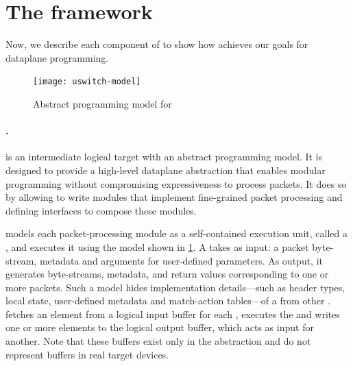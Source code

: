 \documentclass[letterpaper,twocolumn,10pt]{article}
\begin{document}
\section{The \ulang framework}
\label{sec:microp4}
Now, we describe each component of \ulang to show how \ulang achieves
our goals for dataplane programming.
\begin{figure}[!tb]
    \centering
    \texttt{[image: uswitch-model]}
    \caption{Abstract programming model for \uswitch}
    \label{fig:uswitch}
\end{figure}


\paragraph{\uswitch.}
\uswitch is an intermediate logical target with an abstract
programming model. It is designed to provide a high-level dataplane
abstraction that enables modular programming without compromising
expressiveness to process packets. It does so by allowing to write
modules that implement fine-grained packet processing and defining
interfaces to compose these modules.

\uswitch models each packet-processing module as a self-contained
execution unit, called a \emph{\uprogram}, and executes it using the
model shown in \cref{fig:uswitch}. A \uprogram takes as input: a
packet byte-stream, metadata and arguments for user-defined
parameters. As output, it generates byte-streams, metadata, and return
values corresponding to one or more packets. Such a model hides
implementation details---such as header types, local state,
user-defined metadata and match-action tables---of a \uprogram from
other \uprograms.  \uswitch fetches an element from a logical input
buffer for each \uprogram, executes the \uprogram and writes one or
more elements to the logical output buffer, which acts as input for
another. Note that these buffers exist only in the abstraction and do
not represent buffers in real target devices.
\end{document}
